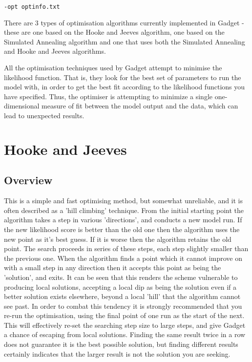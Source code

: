 \documentclass [a4paper, 10pt]{book}
\begin{document}
\begin{verbatim}
-opt optinfo.txt
\end{verbatim}

There are 3 types of optimisation algorithms currently implemented in Gadget - these are one based on the Hooke and Jeeves algorithm, one based on the Simulated Annealing algorithm and one that uses both the Simulated Annealing and Hooke and Jeeves algorithms.

\bigskip
All the optimisation techniques used by Gadget attempt to minimise the likelihood function. That is, they look for the best set of parameters to run the model with, in order to get the best fit according to the likelihood functions you have specified.  Thus, the optimiser is attempting to minimize a single one-dimensional measure of fit between the model output and the data, which can lead to unexpected results.

\section{Hooke and Jeeves}\label{sec:hooke}
\subsection{Overview}
This is a simple and fast optimising method, but somewhat unreliable, and it is often described as a 'hill climbing' technique.  From the initial starting point the algorithm takes a step in various 'directions', and conducts a new model run.  If the new likelihood score is better than the old one then the algorithm uses the new point as it's best guess.  If it is worse then the algorithm retains the old point. The search proceeds in series of these steps, each step slightly smaller than the previous one.  When the algorithm finds a point which it cannot improve on with a small step in any direction then it accepts this point as being the 'solution', and exits.  It can be seen that this renders the scheme vulnerable to producing local solutions, accepting a local dip as being the solution even if a better solution exists elsewhere, beyond a local 'hill' that the algorithm cannot see past.  In order to combat this tendency it is strongly recommended that you re-run the optimisation, using the final point of one run as the start of the next.  This will effectively re-set the searching step size to large steps, and give Gadget a chance of escaping from local solutions.  Finding the same result twice in a row does not guarantee it is the best possible solution, but finding different results certainly indicates that the larger result is not the solution you are seeking.
\end{document}
